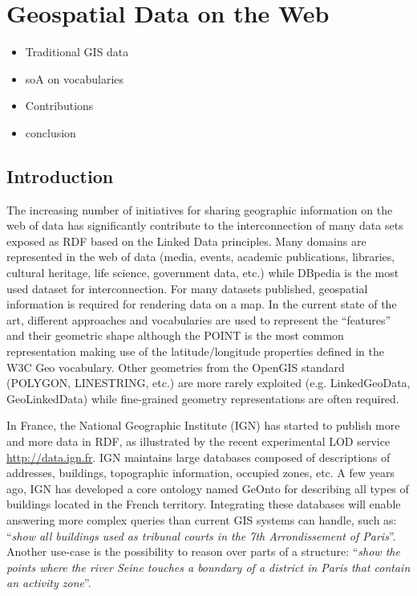 \chapter{Geospatial Data on the Web}
\label{ch:ch1}

\begin{itemize}
\item Traditional GIS data
\item soA on vocabularies
\item Contributions
\item conclusion
\end{itemize}

\section{Introduction}
The increasing number of initiatives for sharing geographic information on the web of data has significantly contribute to the interconnection of many data sets exposed as RDF based on the Linked Data principles. Many domains are represented in the web of data (media, events, academic publications, libraries, cultural heritage, life science, government data, etc.) while DBpedia is the most used dataset for interconnection. For many datasets published, geospatial information is required for rendering data on a map. In the current state of the art, different approaches and vocabularies are used to represent the ``features'' and their geometric shape although the POINT is the most common representation making use of the latitude/longitude properties defined in the W3C Geo vocabulary. Other geometries from the OpenGIS standard (POLYGON, LINESTRING, etc.) are more rarely exploited (e.g. LinkedGeoData, GeoLinkedData) while fine-grained geometry representations are often required.

In France, the National Geographic Institute (IGN) has started to publish more and more data in RDF, as illustrated by the recent experimental LOD service \url{http://data.ign.fr}. IGN maintains large databases composed of descriptions of addresses, buildings, topographic information, occupied zones, etc. A few years ago, IGN has developed a core ontology named GeOnto for describing all types of buildings located in the French territory. Integrating these databases will enable answering more complex queries than current GIS systems can handle, such as: ``\emph{show all buildings used as tribunal courts in the 7th Arrondissement of Paris}''. Another use-case is the possibility to reason over parts of a structure: ``\emph{show the points where the river Seine touches a boundary of a district in Paris that contain an activity zone}''.


